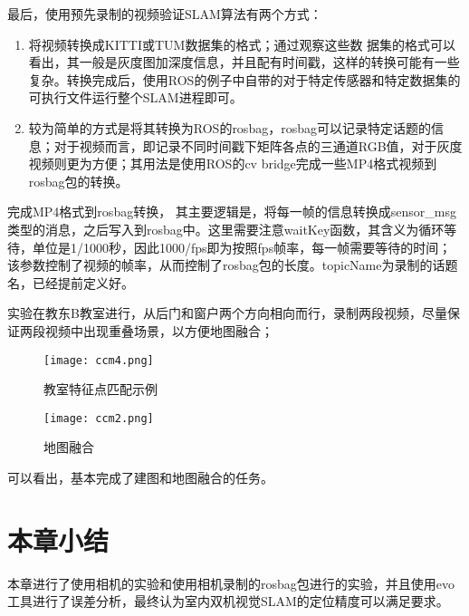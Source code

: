 最后，使用预先录制的视频验证SLAM算法有两个方式：

\begin{enumerate}
	\item 将视频转换成KITTI或TUM数据集的格式；通过观察这些数
	据集的格式可以看出，其一般是灰度图加深度信息，并且配有时间戳，这样的转换可能有一些复杂。转换完成后，使用ROS的例子中自带的对于特定传感器和特定数据集的可执行文件运行整个SLAM进程即可。
	\item 较为简单的方式是将其转换为ROS的rosbag，rosbag可以记录特定话题的信息；对于视频而言，即记录不同时间戳下矩阵各点的三通道RGB值，对于灰度视频则更为方便；其用法是使用ROS的cv bridge完成一些MP4格式视频到rosbag包的转换。
\end{enumerate}

完成MP4格式到rosbag转换，
其主要逻辑是，将每一帧的信息转换成sensor\_msg类型的消息，之后写入到rosbag中。这里需要注意waitKey函数，其含义为循环等待，单位是1/1000秒，因此1000/fps即为按照fps帧率，每一帧需要等待的时间；该参数控制了视频的帧率，从而控制了rosbag包的长度。topicName为录制的话题名，已经提前定义好。

实验在教东B教室进行，从后门和窗户两个方向相向而行，录制两段视频，尽量保证两段视频中出现重叠场景，以方便地图融合；
\begin{figure}[htbp]
	\centering
	\begin{minipage}[t]{0.45\columnwidth} %
		\centering
		\texttt{[image: ccm4.png]}
		\caption{教室特征点匹配示例}
		\label{fig5-1}
	\end{minipage}
	\begin{minipage}[t]{0.45\columnwidth}
		\centering
		\texttt{[image: ccm2.png]}
		\caption{地图融合}
		\label{fig5-2}
	\end{minipage}
\end{figure}

可以看出，基本完成了建图和地图融合的任务。

\section{本章小结}

本章进行了使用相机的实验和使用相机录制的rosbag包进行的实验，并且使用evo工具进行了误差分析，最终认为室内双机视觉SLAM的定位精度可以满足要求。